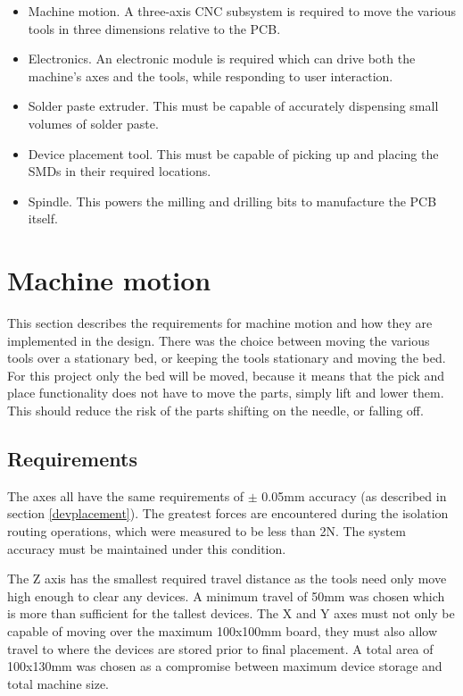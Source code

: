 \begin{itemize}
	\item Machine motion. A three-axis CNC subsystem is required to move
		the various tools in three dimensions relative to the PCB.
	\item Electronics. An electronic module is required which can drive
		both the machine's axes and the tools, while responding to user
		interaction.
	\item Solder paste extruder. This must be capable of accurately
		dispensing small volumes of solder paste.
	\item Device placement tool. This must be capable of picking up and
		placing the SMDs in their required locations.
	\item Spindle. This powers the milling and drilling bits to manufacture
		the PCB itself.
\end{itemize}



\section{Machine motion}
\label{firstsection}
This section describes the requirements for machine motion and how they 
are implemented in the design. There was the choice between moving the various tools over a stationary
bed, or keeping the tools stationary and moving the bed. For this project
only the bed will be moved, because it means that the pick
and place functionality does not have to move the parts, simply lift and lower them. This should reduce the risk of the parts
shifting on the needle, or falling off.%

\subsection{Requirements}
The axes all have the same requirements of $\pm$ 0.05mm accuracy (as 
described in section \ref{devplacement}). The greatest forces are
encountered during the isolation routing operations, which were
measured to be less than 2N. The system accuracy must be maintained
under this condition.

The Z axis has the smallest required travel distance as the tools
need only move high enough to clear any devices. A minimum travel of 50mm
was chosen which is more than sufficient for the tallest devices. The
X and Y axes must not only be capable of moving over the maximum 100x100mm
board, they must also allow travel to where the devices are stored prior
to final placement. A total area of 100x130mm was chosen as a compromise
between maximum device storage and total machine size.

